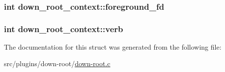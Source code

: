 \subsubsection[{foreground\+\_\+fd}]{\setlength{\rightskip}{0pt plus 5cm}int down\+\_\+root\+\_\+context\+::foreground\+\_\+fd}\label{structdown__root__context_aabe423adf44fd5100e1990396be5096d}
\hypertarget{structdown__root__context_aa6ccc976a2d6c68b164b259aadd833f9}{}
\subsubsection[{verb}]{\setlength{\rightskip}{0pt plus 5cm}int down\+\_\+root\+\_\+context\+::verb}\label{structdown__root__context_aa6ccc976a2d6c68b164b259aadd833f9}


The documentation for this struct was generated from the following file\+:\begin{DoxyCompactItemize}
\item 
src/plugins/down-\/root/\hyperlink{down-root_8c}{down-\/root.\+c}\end{DoxyCompactItemize}
